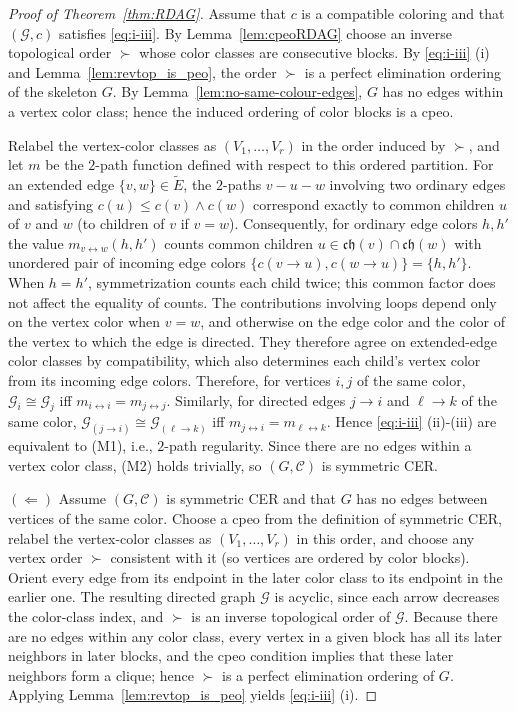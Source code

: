 \documentclass[12pt]{amsart}
\theoremstyle{plain}
\theoremstyle{definition}
\theoremstyle{remark}
\newcommand{\1}{\mathbf{1}}
\def\ch{{\mathfrak{ch}}}
\begin{document}
\begin{proof}[Proof of Theorem~\ref{thm:RDAG}]
\noindent{$(\Rightarrow)$}
Assume that $c$ is a compatible coloring and that $(\mathcal{G},c)$ satisfies \eqref{eq:i-iii}.
By Lemma~\ref{lem:cpeoRDAG} choose an inverse topological order $\succ$ whose color classes are consecutive blocks. 
By \eqref{eq:i-iii} (i) and Lemma~\ref{lem:revtop_is_peo}, the order $\succ$ is a perfect elimination ordering of the skeleton $G$.
By Lemma~\ref{lem:no-same-colour-edges}, $G$ has no edges within a vertex color class; hence the induced ordering of color blocks
is a cpeo.

Relabel the vertex-color classes as $(V_1,\ldots,V_r)$ in the order induced by $\succ$, and let $m$ be the $2$-path function defined with respect to this ordered partition.
For an extended edge $\{v,w\}\in\tilde E$, the $2$-paths
$v-u-w$ involving two ordinary edges and satisfying
$c(u)\le c(v)\wedge c(w)$ correspond exactly to common
children $u$ of $v$ and $w$ (to children of $v$ if $v=w$).
Consequently, for ordinary edge colors $h,h'$ the value $m_{v\leftrightarrow w}(h,h')$ counts common children $u\in\ch(v)\cap\ch(w)$
with unordered pair of incoming edge colors $\{c(v\to u),c(w\to u)\}=\{h,h'\}$.
When $h=h'$, symmetrization counts each child twice;
this common factor does not affect the equality of counts.
The contributions involving loops depend only on the vertex
color when $v=w$, and otherwise on the edge color and the
color of the vertex to which the edge is directed.
They therefore agree on extended-edge color
classes by compatibility, which also determines each child's
vertex color from its incoming edge colors.
Therefore, for vertices $i,j$ of the same color,
$\mathcal{G}_i\cong\mathcal{G}_j$ iff $m_{i\leftrightarrow i}=m_{j\leftrightarrow j}$.
Similarly, for directed edges $j\to i$ and $\ell\to k$ of the same color,
$\mathcal{G}_{(j\to i)}\cong\mathcal{G}_{(\ell\to k)}$ iff $m_{j\leftrightarrow i}=m_{\ell\leftrightarrow k}$.
Hence \eqref{eq:i-iii} (ii)-(iii) are equivalent to (M1), i.e., $2$-path regularity.
Since there are no edges within a vertex color class, (M2) holds trivially, so $(G,\mathcal{C})$ is symmetric CER.

\noindent$(\Leftarrow)$
Assume $(G,\mathcal{C})$ is symmetric CER and that $G$ has no edges between vertices of the same color.
Choose a cpeo from the definition of symmetric CER, relabel the vertex-color classes as $(V_1,\ldots,V_r)$ in this order, and choose any vertex order $\succ$ consistent with it
(so vertices are ordered by color blocks).
Orient every edge from its endpoint in the later color class to its endpoint in the earlier one.
The resulting directed graph $\mathcal G$ is acyclic, since each arrow decreases the color-class index, and $\succ$ is an inverse topological order of $\mathcal G$.
Because there are no edges within any color class, every vertex in a given block has all its later neighbors in later blocks,
and the cpeo condition implies that these later neighbors form a clique; hence $\succ$ is a perfect elimination ordering of $G$.
Applying Lemma~\ref{lem:revtop_is_peo} yields \eqref{eq:i-iii} (i).


\end{proof}
\end{document}
